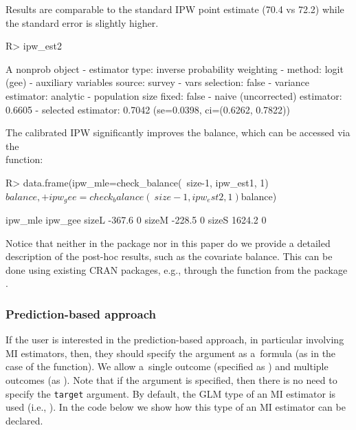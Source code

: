 \documentclass[nojss]{jss}
\begin{document}
Results are comparable to the standard IPW point estimate (70.4 vs 72.2)
while the standard error is slightly higher.

\begin{CodeChunk}
\begin{CodeInput}
R> ipw_est2
\end{CodeInput}
\begin{CodeOutput}
A nonprob object
 - estimator type: inverse probability weighting
 - method: logit (gee)
 - auxiliary variables source: survey
 - vars selection: false
 - variance estimator: analytic
 - population size fixed: false
 - naive (uncorrected) estimator: 0.6605
 - selected estimator: 0.7042 (se=0.0398, ci=(0.6262, 0.7822))
\end{CodeOutput}
\end{CodeChunk}

The calibrated IPW significantly improves the balance, which can be
accessed via the \\  function:

\begin{CodeChunk}
\begin{CodeInput}
R> data.frame(ipw_mle=check_balance(~size-1, ipw_est1, 1)$balance,
+            ipw_gee=check_balance(~size-1, ipw_est2, 1)$balance)
\end{CodeInput}
\begin{CodeOutput}
      ipw_mle ipw_gee
sizeL  -367.6       0
sizeM  -228.5       0
sizeS  1624.2       0
\end{CodeOutput}
\end{CodeChunk}

Notice that neither in the package nor in this paper do we provide a
detailed description of the post-hoc results, such as the covariate
balance. This can be done using existing CRAN packages, e.g., through
the  function from the  package
\citep{cobalt}.

\subsubsection{Prediction-based
approach}\label{prediction-based-approach}

If the user is interested in the prediction-based approach, in
particular involving MI estimators, then, they should specify the
argument  as a~formula (as in the case of the 
function). We allow a~single outcome (specified as
) and multiple outcomes (as
). Note that if the
 argument is specified, then there is no need to specify
the \texttt{target} argument. By default, the GLM type of an MI
estimator is used (i.e., ). In the code
below we show how this type of an MI estimator can be declared.
\end{document}
